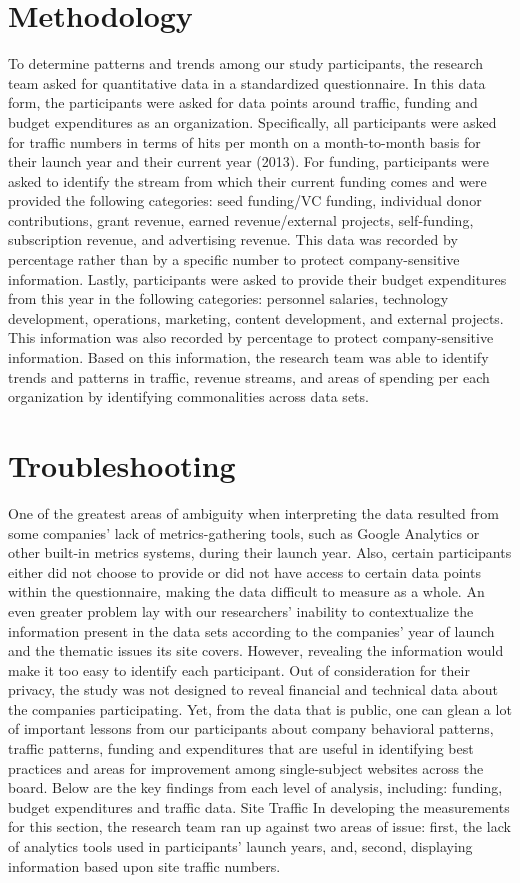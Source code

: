 \section{Methodology}
To determine patterns and trends among our study participants, the
research team asked for quantitative data in a standardized questionnaire.
In this data form, the participants were asked for data points around traffic,
funding and budget expenditures as an organization. Specifically, all
participants were asked for traffic numbers in terms of hits per month
on a month-to-month basis for their launch year and their current year
(2013). For funding, participants were asked to identify the stream from
which their current funding comes and were provided the following categories:
seed funding/VC funding, individual donor contributions, grant
revenue, earned revenue/external projects, self-funding, subscription
revenue, and advertising revenue. This data was recorded by percentage
rather than by a specific number to protect company-sensitive information.
Lastly, participants were asked to provide their budget expenditures
from this year in the following categories: personnel salaries, technology
development, operations, marketing, content development, and external
projects. This information was also recorded by percentage to protect
company-sensitive information.
Based on this information, the research team was able to identify trends and
patterns in traffic, revenue streams, and areas of spending per each organization
by identifying commonalities across data sets.


\section{Troubleshooting}
One of the greatest areas of ambiguity when interpreting the data resulted
from some companies’ lack of metrics-gathering tools, such as Google Analytics
or other built-in metrics systems, during their launch year. Also, certain
participants either did not choose to provide or did not have access to
certain data points within the questionnaire, making the data difficult to
measure as a whole.
An even greater problem lay with our researchers’ inability to contextualize
the information present in the data sets according to the companies’ year of
launch and the thematic issues its site covers. However, revealing the information
would make it too easy to identify each participant. Out of consideration
for their privacy, the study was not designed to reveal financial and
technical data about the companies participating.
Yet, from the data that is public, one can glean a lot of important lessons
from our participants about company behavioral patterns, traffic patterns,
funding and expenditures that are useful in identifying best practices and
areas for improvement among single-subject websites across the board.
Below are the key findings from each level of analysis, including: funding,
budget expenditures and traffic data.
Site Traffic
In developing the measurements for this section, the research team ran up
against two areas of issue: first, the lack of analytics tools used in participants’
launch years, and, second, displaying information based upon site
traffic numbers.

